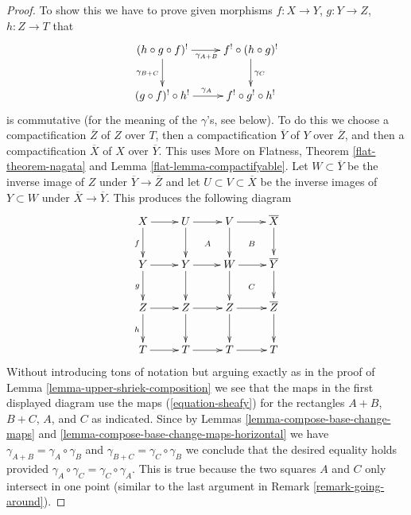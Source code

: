 \begin{proof}
To show this we have to prove given morphisms
$f : X \to Y$, $g : Y \to Z$, $h : Z \to T$
that
$$
\xymatrix{
(h \circ g \circ f)^! \ar[r]_{\gamma_{A + B}} \ar[d]_{\gamma_{B + C}} &
f^! \circ (h \circ g)^! \ar[d]^{\gamma_C} \\
(g \circ f)^! \circ h^! \ar[r]^{\gamma_A} & f^! \circ g^! \circ h^!
}
$$
is commutative (for the meaning of the $\gamma$'s, see below).
To do this we choose a compactification $\overline{Z}$
of $Z$ over $T$, then a compactification $\overline{Y}$ of $Y$ over
$\overline{Z}$, and then a compactification $\overline{X}$ of
$X$ over $\overline{Y}$. This uses
More on Flatness, Theorem \ref{flat-theorem-nagata} and
Lemma \ref{flat-lemma-compactifyable}.
Let $W \subset \overline{Y}$ be the inverse image of $Z$ under
$\overline{Y} \to \overline{Z}$ and let $U \subset V \subset \overline{X}$
be the inverse images of $Y \subset W$ under $\overline{X} \to \overline{Y}$.
This produces the following diagram
$$
\xymatrix{
X \ar[d]_f \ar[r] & U \ar[r] \ar[d] \ar@{}[dr]|A &
V \ar[d] \ar[r] \ar@{}[rd]|B & \overline{X} \ar[d] \\
Y \ar[d]_g \ar[r] & Y \ar[r] \ar[d] & W \ar[r] \ar[d] \ar@{}[rd]|C &
\overline{Y} \ar[d] \\
Z \ar[d]_h \ar[r] & Z \ar[d] \ar[r] & Z \ar[d] \ar[r] & \overline{Z} \ar[d] \\
T \ar[r] & T \ar[r] & T \ar[r] & T
}
$$
Without introducing tons of notation but arguing exactly
as in the proof of Lemma \ref{lemma-upper-shriek-composition}
we see that the maps in the first displayed diagram use the
maps (\ref{equation-sheafy}) for the rectangles
$A + B$, $B + C$, $A$, and $C$ as indicated. Since by
Lemmas \ref{lemma-compose-base-change-maps} and
\ref{lemma-compose-base-change-maps-horizontal}
we have $\gamma_{A + B} = \gamma_A \circ \gamma_B$ and
$\gamma_{B + C} = \gamma_C \circ \gamma_B$  we conclude
that the desired equality holds provided
$\gamma_A \circ \gamma_C = \gamma_C \circ \gamma_A$.
This is true because the two squares $A$ and $C$ only
intersect in one point (similar to the last argument in
Remark \ref{remark-going-around}).
\end{proof}

